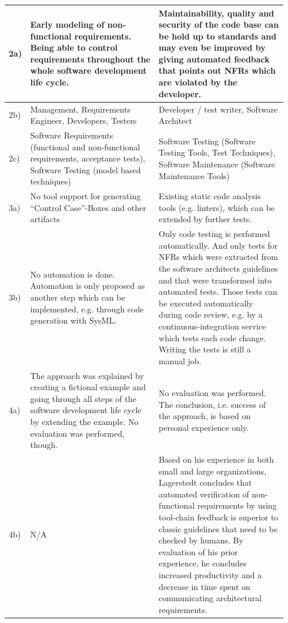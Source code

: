 \begin{small}
\begin{longtable}[H]{p{0.03\linewidth}|p{0.455\linewidth}|p{0.455\linewidth}}
	2a) & 
	
	Early modeling of non-functional requirements. Being able to control requirements throughout the whole software development life cycle.
	
	&
	Maintainability, quality and security of the code base can be hold up to standards and may even be improved by giving automated feedback that points out NFRs which are violated by the developer.
	
	\\
	\hline
	2b) & 
	Management, Requirements Engineer, Developers, Testers
	&
	Developer / test writer, Software Architect
	\\
	\hline
	
	2c) &
	Software Requirements (functional and non-functional requirements, acceptance tests), Software Testing (model based techniques)
	&
	Software Testing (Software Testing Tools, Test Techniques), Software Maintenance (Software Maintenance Tools) \\
	\hline
	3a) & 
	No tool support for generating \enquote{Control Case}-Boxes and other artifacts &
	Existing static code analysis tools (e.g. linters), which can be extended by further tests.
	\\
	\hline
	3b) & 
	No automation is done. Automation is only proposed as another step which can be implemented, e.g. through code generation with SysML.
	&
	Only code testing is performed automatically.
	And only tests for NFRs which were extracted from the software architects guidelines and that were transformed into automated tests.
	Those tests can be executed automatically during code review, e.g. by a continuous-integration service which tests each code change. Writing the tests is still a manual job.
	\\
	\hline
	4a)
	&
	The approach was explained by creating a fictional example and going through all steps of the software development life cycle by extending the example. No evaluation was performed, though.
	
	&
	No evaluation was performed. The conclusion, i.e. success of the approach, is based on personal experience only.
	\\
	\hline
	4b) &
	N/A &
	
	Based on his experience in both small and large organizations, Lagerstedt concludes that automated verification of non-functional requirements by using tool-chain feedback is superior to classic guidelines that need to be checked by humans. By evaluation of his prior experience, he concludes increased productivity and a decrease in time spent on communicating architectural requirements. \\
	\hline
\end{longtable}
\end{small}


